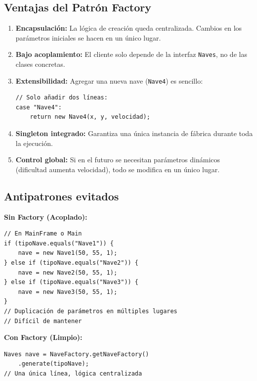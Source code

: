 \documentclass[12pt]{article}
\begin{document}
\subsection{Ventajas del Patrón Factory}

\begin{enumerate}
    \item \textbf{Encapsulación:} La lógica de creación queda centralizada. Cambios en los parámetros iniciales se hacen en un único lugar.
    
    \item \textbf{Bajo acoplamiento:} El cliente solo depende de la interfaz \texttt{Naves}, no de las clases concretas.
    
    \item \textbf{Extensibilidad:} Agregar una nueva nave (\texttt{Nave4}) es sencillo:
    \begin{lstlisting}
// Solo añadir dos líneas:
case "Nave4":
    return new Nave4(x, y, velocidad);
    \end{lstlisting}
    
    \item \textbf{Singleton integrado:} Garantiza una única instancia de fábrica durante toda la ejecución.
    
    \item \textbf{Control global:} Si en el futuro se necesitan parámetros dinámicos (dificultad aumenta velocidad), todo se modifica en un único lugar.
\end{enumerate}

\subsection{Antipatrones evitados}

\textbf{Sin Factory (Acoplado):}
\begin{lstlisting}
// En MainFrame o Main
if (tipoNave.equals("Nave1")) {
    nave = new Nave1(50, 55, 1);
} else if (tipoNave.equals("Nave2")) {
    nave = new Nave2(50, 55, 1);
} else if (tipoNave.equals("Nave3")) {
    nave = new Nave3(50, 55, 1);
}
// Duplicación de parámetros en múltiples lugares
// Difícil de mantener
\end{lstlisting}

\textbf{Con Factory (Limpio):}
\begin{lstlisting}
Naves nave = NaveFactory.getNaveFactory()
    .generate(tipoNave);
// Una única línea, lógica centralizada
\end{lstlisting}
\end{document}
